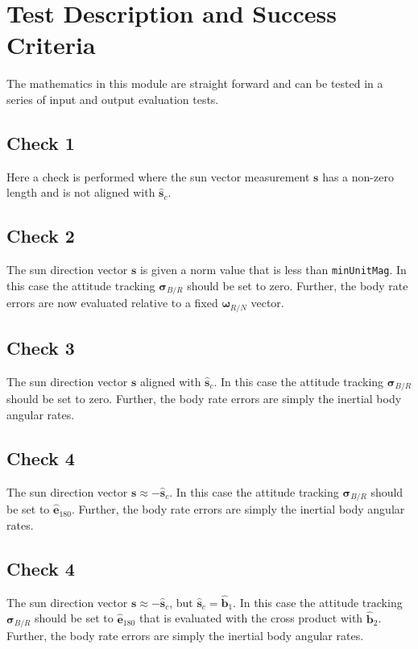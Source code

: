 
\section{Test Description and Success Criteria}
The mathematics in this module are straight forward and can be tested in a series of input and output evaluation tests.


\subsection{Check 1}
Here a check is performed where the sun vector measurement $\bm s$ has a non-zero length and is not aligned with $\hat{\bm s}_{c}$.  

\subsection{Check 2}
The sun direction vector $\bm s$ is given a norm value that is less than {\tt minUnitMag}.  In this case the attitude tracking $\bm\sigma_{B/R}$ should be set to zero.  Further, the body rate errors are now evaluated relative to a fixed $\bm\omega_{R/N}$ vector.  

\subsection{Check 3}
The sun direction vector $\bm s$ aligned with $\hat{\bm s}_{c}$.  In this case the attitude tracking $\bm\sigma_{B/R}$ should be set to zero.  Further, the body rate errors are simply the inertial body angular rates.  

\subsection{Check 4}
The sun direction vector $\bm s \approx -\hat{\bm s}_{c}$.  In this case the attitude tracking $\bm\sigma_{B/R}$ should be set to $\hat{\bm e}_{180}$.  Further, the body rate errors are simply the inertial body angular rates.  

\subsection{Check 4}
The sun direction vector $\bm s \approx -\hat{\bm s}_{c}$, but $\hat{\bm s}_{c} = \hat{\bm b}_{1}$.  In this case the attitude tracking $\bm\sigma_{B/R}$ should be set to $\hat{\bm e}_{180}$ that is evaluated with the cross product with $\hat{\bm b}_{2}$.  Further, the body rate errors are simply the inertial body angular rates.  


